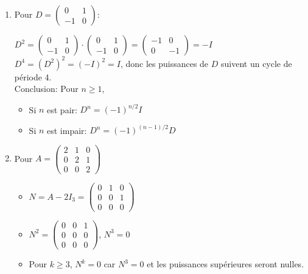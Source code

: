 \documentclass[10pt,a4paper]{article}
\begin{document}
\begin{enumerate}
    \item Pour $D = \begin{pmatrix} 0 & 1 \\ -1 & 0 \end{pmatrix}$:

    $D^2 = \begin{pmatrix} 0 & 1 \\ -1 & 0 \end{pmatrix} \cdot \begin{pmatrix} 0 & 1 \\ -1 & 0 \end{pmatrix} = \begin{pmatrix} -1 & 0 \\ 0 & -1 \end{pmatrix} = -I$\\
    $D^4 = (D^2)^2 = (-I)^2 = I$, donc les puissances de $D$ suivent un cycle de période 4.\\
    Conclusion: Pour $n \geq 1$,
    \begin{itemize}
        \item Si $n$ est pair: $D^n = (-1)^{n/2} I$
        \item Si $n$ est impair: $D^n = (-1)^{(n-1)/2} D$
    \end{itemize}

    \item Pour $
    A = \begin{pmatrix}
    2 & 1 & 0 \\
    0 & 2 & 1 \\
    0 & 0 & 2
    \end{pmatrix}
    $
    \begin{itemize}
        \item $N = A - 2I_3 = \begin{pmatrix}
        0 & 1 & 0 \\
        0 & 0 & 1 \\
        0 & 0 & 0
        \end{pmatrix}$

        \item $N^2 = \begin{pmatrix}
        0 & 0 & 1 \\
        0 & 0 & 0 \\
        0 & 0 & 0
        \end{pmatrix}$, $N^3 = 0$

        \item Pour $k \geq 3$, $N^k = 0$ car $N^3 = 0$ et les puissances supérieures seront nulles.


\end{itemize}
\end{enumerate}
\end{document}
